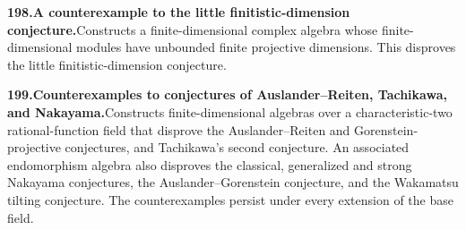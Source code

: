 \documentclass[11pt,a4paper]{article}
\begin{document}
  \par \begin{minipage}{\linewidth}
  \fontsize{10.5}{12.6}\selectfont\RaggedRight
  \hypertarget{result 198}{}
  {\bfseries\textcolor{muted}{198.}\enspace A counterexample to the little finitistic-dimension conjecture.}\enspace Constructs a finite-dimensional complex algebra whose finite-dimensional modules have unbounded finite projective dimensions. This disproves the little finitistic-dimension conjecture.\par
  \end{minipage}\par\vspace{5pt}



  \par \begin{minipage}{\linewidth}
  \fontsize{10.5}{12.6}\selectfont\RaggedRight
  \hypertarget{result 199}{}
  {\bfseries\textcolor{muted}{199.}\enspace Counterexamples to conjectures of Auslander--Reiten, Tachikawa, and Nakayama.}\enspace Constructs finite-dimensional algebras over a characteristic-two rational-function field that disprove the Auslander--Reiten and Gorenstein-projective conjectures, and Tachikawa's second conjecture. An associated endomorphism algebra also disproves the classical, generalized and strong Nakayama conjectures, the Auslander--Gorenstein conjecture, and the Wakamatsu tilting conjecture. The counterexamples persist under every extension of the base field.\par
  \end{minipage}\par\vspace{5pt}
\end{document}
